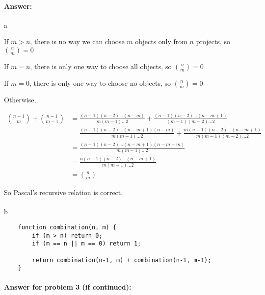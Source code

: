 \documentclass{article}
\begin{document}
\paragraph{Answer:}
\paragraph{}
a

If $m>n$, there is no way we can choose $m$ objects only from $n$ projects, so ${n \choose m}=0$

If $m=n$, there is only one way to choose all objects, so ${n \choose m}=0$

If $m=0$, there is only one way to choose no objects, so ${n \choose m}=0$

Otherwise,

$$\begin{aligned}
{n-1 \choose m} + {n-1 \choose m-1} &= \frac{(n-1)(n-2)\dots(n-m)}{m(m-1)\dots2} + \frac{(n-1)(n-2)\dots(n-m+1)}{(m-1)(m-2)\dots2}\\
&=\frac{(n-1)(n-2)\dots(n-m+1)(n-m)}{m(m-1)\dots2} + \frac{m(n-1)(n-2)\dots(n-m+1)}{m(m-1)(m-2)\dots2}\\
&=\frac{(n-1)(n-2)\dots(n-m+1)(n-m+m)}{m(m-1)\dots2}\\
&=\frac{n(n-1)(n-2)\dots(n-m+1)}{m(m-1)\dots2}\\
&={n \choose m}
\end{aligned}$$

So Pascal's recursive relation is correct.

\paragraph{}

b

\begin{verbatim}
    function combination(n, m) {
        if (m > n) return 0;
        if (m == n || m == 0) return 1;

        return combination(n-1, m) + combination(n-1, m-1);
    }
\end{verbatim}


\newpage
\paragraph{Answer for problem 3 (if continued):}

\paragraph{}
\end{document}
